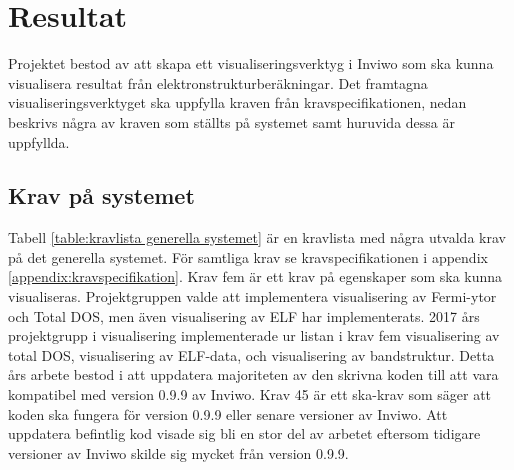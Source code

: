 \documentclass[a4paper,12pt]{article}
\begin{document}
\section{Resultat}
\label{ch:resultat}
Projektet bestod av att skapa ett visualiseringsverktyg i Inviwo som ska kunna visualisera resultat från elektronstrukturberäkningar. Det framtagna visualiseringsverktyget ska uppfylla kraven från kravspecifikationen, nedan beskrivs några av kraven som ställts på systemet samt huruvida dessa är uppfyllda.

\subsection{Krav på systemet}
Tabell \ref{table:kravlista generella systemet} är en kravlista med några utvalda krav på det generella systemet. För samtliga krav se kravspecifikationen i appendix \ref{appendix:kravspecifikation}. Krav fem är ett krav på egenskaper som ska kunna visualiseras. Projektgruppen valde att implementera visualisering av Fermi-ytor och Total DOS, men även visualisering av ELF har implementerats. 2017 års projektgrupp i visualisering implementerade ur listan i krav fem visualisering av total DOS, visualisering av ELF-data, och visualisering av bandstruktur. Detta års arbete bestod i att uppdatera majoriteten av den skrivna koden till att vara kompatibel med version 0.9.9 av Inviwo. Krav 45 är ett ska-krav som säger att koden ska fungera för version 0.9.9 eller senare versioner av Inviwo. Att uppdatera befintlig kod visade sig bli en stor del av arbetet eftersom tidigare versioner av Inviwo skilde sig mycket från version 0.9.9.
 
\end{document}

